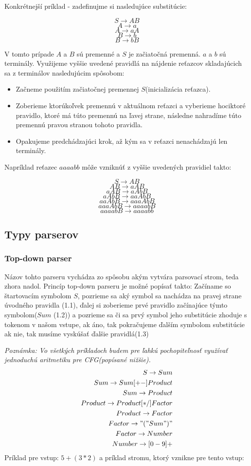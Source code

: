 \documentclass[12pt,a4paper]{report}
\theoremstyle{definition}
\theoremstyle{remark}
\begin{document}
\noindent Konkrétnejší príklad - zadefinujme si nasledujúce substitúcie:

$$ S \to AB $$
$$ A \to a $$
$$ A \to aA $$
$$ B \to b $$
$$ B \to bB $$

V tomto prípade $A$ a $B$ sú premenné a $S$ je začiatočná premenná. $a$ a $b$ sú terminály. Využijeme vyššie uvedené pravidlá na nájdenie reťazcov skladajúcich sa z terminálov nasledujúcim spôsobom:
\begin{itemize}
\item Začneme použitím začiatočnej premennej $S$(inicializácia reťazca).
\item Zoberieme ktorúkoľvek premennú v aktuálnom reťazci a vyberieme hociktoré pravidlo, ktoré má túto premennú na ľavej strane, následne nahradíme túto premennú pravou stranou tohoto pravidla.
\item Opakujeme predchádzajúci krok, až kým sa v reťazci nenachádzajú len terminály.
\end{itemize}

Napríklad reťazec $aaaabb$ môže vzniknúť z vyššie uvedených pravidiel takto:

$$ S \to AB $$
$$ AB \to aAB $$
$$ aAB \to aAbB $$
$$ aAbB \to aaAbB $$
$$ aaAbB \to aaaAbB $$
$$ aaaAbB \to aaaabB $$
$$ aaaabB \to aaaabb $$
\subsection{Typy parserov}
\subsubsection*{Top-down parser} 
Názov tohto parseru vychádza zo spôsobu akým vytvára parsovací strom, teda zhora nadol.
Princíp top-down parseru je možné popísať takto: Začíname so štartovacím symbolom $S$, pozrieme sa aký symbol sa nachádza na pravej strane úvodného pravidla (1.1), ďalej si zoberieme prvé pravidlo začínajúce týmto symbolom($Sum$ (1.2)) a pozrieme sa či sa prvý symbol jeho substitúcie zhoduje s tokenom v našom vstupe, ak áno, tak pokračujeme ďalším symbolom substitúcie ak nie, tak musíme vyskúšať ďalšie pravidlá(1.3)

\textit{Poznámka: Vo všetkých príkladoch budem pre ľahkú pochopiteľnosť využívať jednoduchú aritmetiku pre CFG(popísané nižšie).} 
\begin{align}
S \to Sum \\
Sum \to Sum [+-] Product \\
Sum \to Product \\
Product \to Product [*/] Factor \\
Product \to Factor \\
Factor \to "(" Sum ")" \\
Factor \to Number \\
Number \to [0-9]+
\end{align}
\noindent 
Príklad pre vstup: $ 5 + (3 * 2)$ a príklad stromu, ktorý vznikne pre tento vstup: \\
\end{document}
